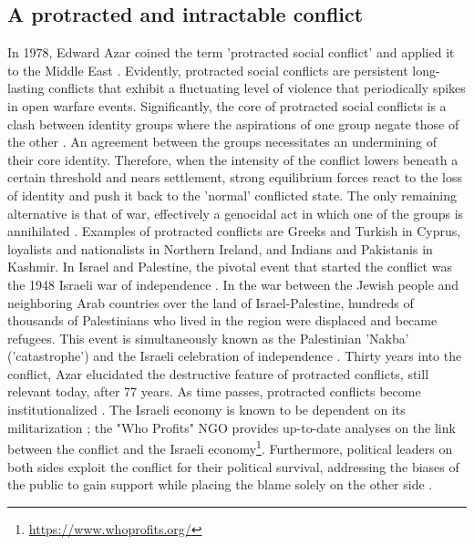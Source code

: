 \documentclass[dissertation,math,vertlayout,pdfa,colorlinks,nologo]{aaltoseries}
\begin{document}
\subsection{A protracted and intractable conflict}
In 1978, Edward Azar coined the term 'protracted social conflict' and applied it to the Middle East \cite{azarProtractedSocialConflict1978}. Evidently, protracted social conflicts are persistent long-lasting conflicts that exhibit a fluctuating level of violence that periodically spikes in open warfare events. Significantly, the core of protracted social conflicts is a clash between identity groups where the aspirations of one group negate those of the other \cite[p. 77]{fisherInteractiveConflictResolution1997}. An agreement between the groups necessitates an undermining of their core identity. Therefore, when the intensity of the conflict lowers beneath a certain threshold and nears settlement, strong equilibrium forces react to the loss of identity and push it back to the 'normal' conflicted state. The only remaining alternative is that of war, effectively a genocidal act in which one of the groups is annihilated \cite{azarProtractedSocialConflict1978}. Examples of protracted conflicts are Greeks and Turkish in Cyprus, loyalists and nationalists in Northern Ireland, and Indians and Pakistanis in Kashmir. In Israel and Palestine, the pivotal event that started the conflict was the 1948 Israeli war of independence \cite{selaIsraeliPalestinianMemories2016}. In the war between the Jewish people and neighboring Arab countries over the land of Israel-Palestine, hundreds of thousands of Palestinians who lived in the region were displaced and became refugees. This event is simultaneously known as the Palestinian 'Nakba' ('catastrophe') and the Israeli celebration of independence \cite{pogrund1948IndependenceNakba2008}. Thirty years into the conflict, Azar elucidated the destructive feature of protracted conflicts, still relevant today, after 77 years. As time passes, protracted conflicts become institutionalized \cite{azarProtractedSocialConflict1978}. The Israeli economy is known to be dependent on its militarization \cite{sandovalMilitaryIndustryIsraelPalestine2021}; the "Who Profits" NGO provides up-to-date analyses on the link between the conflict and the Israeli economy\footnote{\url{https://www.whoprofits.org/}}. Furthermore, political leaders on both sides exploit the conflict for their political survival, addressing the biases of the public to gain support while placing the blame solely on the other side \cite{behrmanExploitingCognitionBlame2021}.
\end{document}

